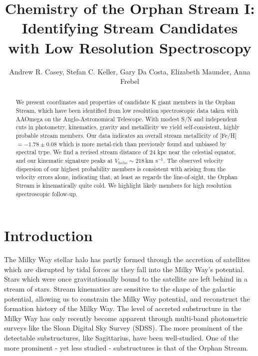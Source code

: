 \documentclass{emulateapj}
\begin{document}
\title{Chemistry of the Orphan Stream I: Identifying Stream Candidates with Low Resolution Spectroscopy}

\author{Andrew R. Casey, Stefan C. Keller, Gary Da Costa, Elizabeth Maunder, Anna Frebel}

\begin{abstract}
We present coordinates and properties of candidate K giant members in the Orphan Stream, which have been identified from low resolution spectroscopic data taken with AAOmega on the Anglo-Astronomical Telescope. With modest S/N and independent cuts in photometry, kinematics, gravity and metallicity we yield self-consistent, highly probable stream members. Our data indicates an overall stream metallicity of [Fe/H] $= -1.78 \pm 0.08$ which is more metal-rich than previously found and unbiased by spectral type. We find a revised stream distance of 24 kpc near the celestial equator, and our kinematic signature peaks at $V_{helio} \sim 218$\,km s$^{-1}$. The observed velocity dispersion of our highest probability members is consistent with arising from the velocity errors alone, indicating that, at least as regards the
line-of-sight, the Orphan Stream is kinematically quite cold. We highlight likely members for high resolution spectroscopic follow-up.
\end{abstract}


\section{Introduction}
\label{sec:introduction}

The Milky Way stellar halo has partly formed through the accretion of satellites which are disrupted by tidal forces as they fall into the Milky Way's potential. Stars which were once gravitationally bound to the satellite are left behind in a stream of stars. Stream kinematics are sensitive to the shape of the galactic potential, allowing us to constrain the Milky Way potential, and reconstruct the formation history of the Milky Way. The level of accreted substructure in the Milky Way has only recently become apparent through multi-band photometric surveys like the Sloan Digital Sky Survey (SDSS). The more prominent of the detectable substructures, like Sagittarius, have been well-studied. One of the more prominent \-- yet less studied \-- substructures is that of the Orphan Stream. 
\end{document}

